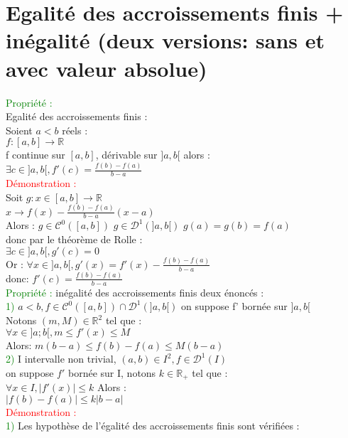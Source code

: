 \documentclass{article}
\begin{document}
\section{Egalité des accroissements finis + inégalité (deux versions: sans et avec valeur absolue)}
\textcolor{green}{Propriété :} \\  
Egalité des accroissements finis : \\ 
Soient $a<b$ réels : \\ 
$f:[a,b]\rightarrow \mathbb{R}$ \\ 
f continue sur $[a,b]$, dérivable sur $]a,b[$ alors : \\ 
$\exists c \in ]a,b[, f'(c)= \frac{f(b)-f(a)}{b-a}$ \\ 
\textcolor{red}{Démonstration :} \\ 
Soit $g:x \in [a,b] \rightarrow \mathbb{R}$ \\ 
$x \rightarrow f(x) - \frac{f(b)-f(a)}{b-a}(x-a)$ \\
Alors : $g \in \mathcal{C}^0([a,b])$ $g \in \mathcal{D}^1(]a,b[)$ $g(a)=g(b)=f(a)$ \\
donc par le théorème de Rolle : \\ 
$\exists c \in ]a,b[, g'(c)=0$ \\ 
Or : $\forall x \in ]a,b[, g'(x)=f'(x)-\frac{f(b)-f(a)}{b-a}$ \\ 
donc: $f'(c)= \frac{f(b)-f(a)}{b-a}$ \\ 
\textcolor{green}{Propriété :} inégalité des accroissements finis deux énoncés : \\ 
\textcolor{green}{1)} $a<b, f \in \mathcal{C}^0([a,b])\cap \mathcal{D}^1(]a,b[)$ on suppose f' bornée sur $]a,b[$ \\ 
Notons $(m,M) \in \mathbb{R}^2$ tel que : \\ 
$\forall x \in ]a;b[, m \leq f'(x) \leq M$ \\ 
Alors: $m(b-a)\leq f(b) -f(a) \leq M(b-a)$ \\ 
\textcolor{green}{2)} I intervalle non trivial, $(a,b) \in I^2, f \in \mathcal{D}^1(I)$ \\ 
on suppose $f'$ bornée sur I, notons $k \in \mathbb{R}_+$ tel que : \\ 
$\forall x \in I, |f'(x)| \leq k$ Alors : \\ 
$|f(b)-f(a)| \leq k |b-a|$ \\ 
\textcolor{red}{Démonstration :} \\ 
\textcolor{green}{1)} Les hypothèse de l'égalité des accroissements finis sont vérifiées : \\ 
\end{document}
